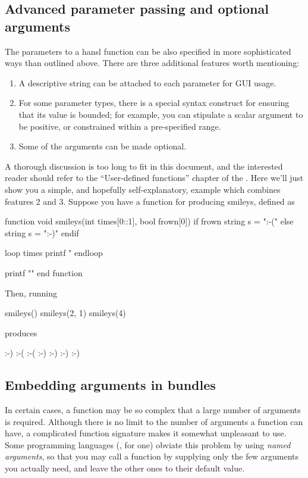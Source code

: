 \subsection{Advanced parameter passing and optional arguments}

The parameters to a hansl function can be also specified in more
sophisticated ways than outlined above. There are three additional
features worth mentioning:
\begin{enumerate}
\item A descriptive string can be attached to each parameter for GUI usage.
\item For some parameter types, there is a special syntax construct
  for ensuring that its value is bounded; for example, you can
  stipulate a scalar argument to be positive, or constrained within a
  pre-specified range.
\item Some of the arguments can be made optional.
\end{enumerate}

A thorough discussion is too long to fit in this document, and the
interested reader should refer to the ``User-defined functions''
chapter of the \GUG. Here we'll just show you a simple, and hopefully
self-explanatory, example which combines features 2 and 3. Suppose
you have a function for producing smileys, defined as
\begin{code}
function void smileys(int times[0::1], bool frown[0])
    if frown
        string s = ":-("
    else
        string s = ":-)"
    endif
    
    loop times
        printf "%
    endloop
    
    printf "\n"
end function
\end{code}

Then, running
\begin{code}
smileys()
smileys(2, 1)
smileys(4)
\end{code}

produces

\begin{code}
:-) 
:-( :-( 
:-) :-) :-) :-) 
\end{code}

\subsection{Embedding arguments in bundles}

In certain cases, a function may be so complex that a large number of
arguments is required. Although there is no limit to the number of
arguments a function can have, a complicated function signature makes
it somewhat unpleasant to use. Some programming languages (, for one)
obviate this problem by using \emph{named arguments}, so that you may
call a function by supplying only the few arguments you actually need,
and leave the other ones to their default value.

